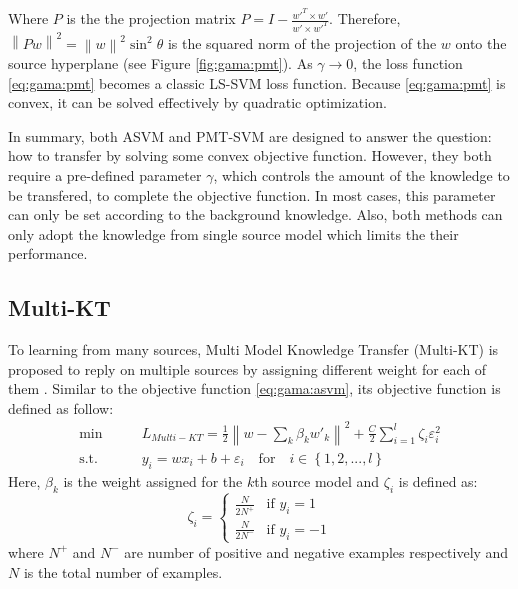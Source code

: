 Where $P$ is the the projection matrix $P = I - \frac{{w{'^T} \times w'}}{{w' \times w{'^T}}}$. Therefore, ${\left\| {Pw} \right\|^2} = {\left\| w \right\|^2}{\sin ^2}\theta $ is the
squared norm of the projection of the $w$ onto the source hyperplane (see Figure \ref{fig:gama:pmt}). As $\gamma \rightarrow 0$, the loss function \eqref{eq:gama:pmt} becomes a classic LS-SVM loss function. Because \eqref{eq:gama:pmt} is convex, it can be solved effectively by quadratic optimization.

In summary, both ASVM and PMT-SVM are designed to answer the question: how to transfer by solving some convex objective function. However, they both require a pre-defined parameter $\gamma$, which controls the amount of the knowledge to be transfered, to complete the objective function. In most cases, this parameter can only be set according to the background knowledge. Also, both methods can only adopt the knowledge from single source model which limits the their performance. 
\subsection{Multi-KT}
To learning from many sources, Multi Model Knowledge Transfer (Multi-KT) is proposed to reply on multiple sources by assigning different weight for each of them \cite{tommasi2014learning}. Similar to the objective function \eqref{eq:gama:asvm}, its objective function is defined as follow: 
\begin{equation}\label{eq:gama:multi}
\begin{aligned}
\min \qquad& {L_{Multi - KT}} = \frac{1}{2}{\left\| {w - \sum\limits_k {{\beta _k}} {{w'}_k}} \right\|^2} + \frac{C}{2}\sum\limits_{i = 1}^l {{\zeta _i}\varepsilon _i^2}  \\
\text{s.t.}\qquad&{y_i} = w{x_i} + b + {\varepsilon _i} \quad   \text{for} \quad i \in \left\{ {1,2,...,l} \right\}
\end{aligned}
\end{equation}
Here, $\beta_k$ is the weight assigned for the $k$th source model and $\zeta _i$ is defined as:
\begin{equation*}
{\zeta _i} = \left\{ {\begin{array}{*{20}{c}}
{\frac{N}{{2{N^ + }}}}&{{\text{if }}{y_i} =1}\\
{\frac{N}{{2{N^ - }}}}&{{\text{if }}{y_i} =- 1}
\end{array}} \right.
\end{equation*}
where $N^+$ and $N^-$ are number of positive and negative examples respectively and $N$ is the total number of examples. 

